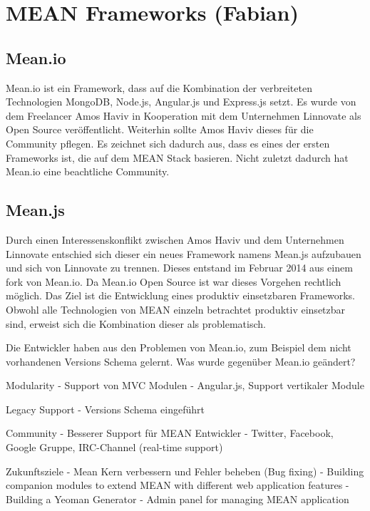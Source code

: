 \chapter{MEAN Frameworks (Fabian)}\label{mean-frameworks-fabian}

\section{Mean.io}\label{mean.io}

Mean.io ist ein Framework, dass auf die Kombination der verbreiteten
Technologien MongoDB, Node.js, Angular.js und Express.js setzt. Es wurde
von dem Freelancer Amos Haviv in Kooperation mit dem Unternehmen
Linnovate als Open Source veröffentlicht. Weiterhin sollte Amos Haviv
dieses für die Community pflegen. Es zeichnet sich dadurch aus, dass es
eines der ersten Frameworks ist, die auf dem MEAN Stack basieren. Nicht
zuletzt dadurch hat Mean.io eine beachtliche Community.

\section{Mean.js}\label{mean.js}

Durch einen Interessenskonflikt zwischen Amos Haviv und dem Unternehmen
Linnovate entschied sich dieser ein neues Framework namens Mean.js
aufzubauen und sich von Linnovate zu trennen. Dieses entstand im Februar
2014 aus einem fork von Mean.io. Da Mean.io Open Source ist war dieses
Vorgehen rechtlich möglich. Das Ziel ist die Entwicklung eines produktiv
einsetzbaren Frameworks. Obwohl alle Technologien von MEAN einzeln
betrachtet produktiv einsetzbar sind, erweist sich die Kombination
dieser als problematisch.

Die Entwickler haben aus den Problemen von Mean.io, zum Beispiel dem
nicht vorhandenen Versions Schema gelernt. Was wurde gegenüber Mean.io
geändert?

Modularity - Support von MVC Modulen - Angular.js, Support vertikaler
Module

Legacy Support - Versions Schema eingeführt

Community - Besserer Support für MEAN Entwickler - Twitter, Facebook,
Google Gruppe, IRC-Channel (real-time support)

Zukunftsziele - Mean Kern verbessern und Fehler beheben (Bug fixing) -
Building companion modules to extend MEAN with different web application
features - Building a Yeoman Generator - Admin panel for managing MEAN
application

